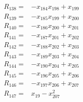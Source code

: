 \begin{align*}
R_{138}={}&-x_{184}x_{198}+x_{199}\\[3pt]
R_{139}={}&-x_{185}x_{199}+x_{200}\\[3pt]
R_{140}={}&-x_{186}x_{200}+x_{201}\\[3pt]
R_{141}={}&-x_{187}x_{201}+x_{202}\\[3pt]
R_{142}={}&-x_{188}x_{202}+x_{203}\\[3pt]
R_{143}={}&-x_{189}x_{203}+x_{204}\\[3pt]
R_{144}={}&-x_{190}x_{204}+x_{205}\\[3pt]
R_{145}={}&-x_{196}x_{205}+x_{206}\\[3pt]
R_{146}={}&-x_{197}x_{206}+x_{207}\\[3pt]
R_{147}={}&x_{19}-x_{207}^{2}\\[3pt]
\end{align*}
